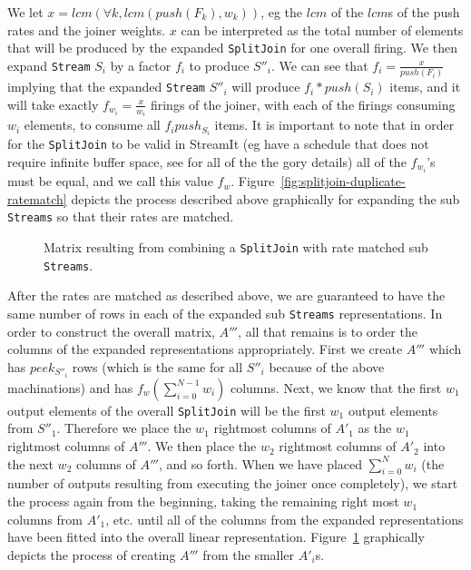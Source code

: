 We let $x=lcm(\forall k, lcm(push(F_k),w_k))$, eg the
$lcm$ of the $lcm$s of the push rates and the joiner weights.
$x$ can be interpreted as the total number of elements that will be 
produced by the expanded {\tt SplitJoin} for one overall firing.
We then expand {\tt Stream} $S_i$ by a factor $f_i$ to produce $S''_i$.
We can see that $f_i=\frac{x}{push(F_i)}$ implying that the expanded {\tt Stream} $S''_i$ will
produce $f_i*push(S_i)$ items, and it will take exactly $f_{w_i}=\frac{x}{w_i}$ firings of the 
joiner, with each of the firings consuming $w_i$ elements, to consume all $f_{i}push_{S_i}$ items.
It is important to note that in order for the {\tt SplitJoin} to be valid in StreamIt
(eg have a schedule that does not require infinite buffer space, see \cite{karczma-thesis} for
all of the the gory details) all of the $f_{w_i}$'s must be equal, and we call this value $f_w$.
Figure~\ref{fig:splitjoin-duplicate-ratematch} depicts the process described above graphically for
expanding the sub {\tt Streams} so that their rates are matched.

\begin{figure}
\center
\epsfxsize=3.0in
\caption{Matrix resulting from combining a {\tt SplitJoin} with rate matched sub {\tt Streams}.}
\label{fig:splitjoin-duplicate-matrix}
\end{figure}

After the rates are matched as described above, we are guaranteed to have the same number of rows
in each of the expanded sub {\tt Streams} representations. In order to construct the overall matrix,
$A'''$, all that remains is to order the columns of the expanded representations appropriately. 
First we create $A'''$ which has $peek_{S''_i}$ rows (which is the same for all $S''_i$ because 
of the above machinations) and has $f_w(\sum_{i=0}^{N-1}w_i)$ columns. Next, we know that 
the first $w_1$ output elements of the overall {\tt SplitJoin} will be the first $w_1$ output elements
from $S''_1$. Therefore we place the $w_1$ rightmost columns of $A'_1$ as the $w_1$ rightmost 
columns of $A'''$. We then place the $w_2$ rightmost columns of $A'_2$ into the next $w_2$ columns 
of $A'''$, and so forth. When we have placed $\sum_{i=0}^{N}w_{i}$ (the number of outputs resulting from 
executing the joiner once completely), we start the process again from the beginning, taking the remaining
right most $w_1$ columns from $A'_1$, etc. until all of the columns from the expanded representations have
been fitted into the overall linear representation. Figure~\ref{fig:splitjoin-duplicate-matrix} 
graphically depicts the process of creating $A'''$ from the smaller $A'_i$s.



